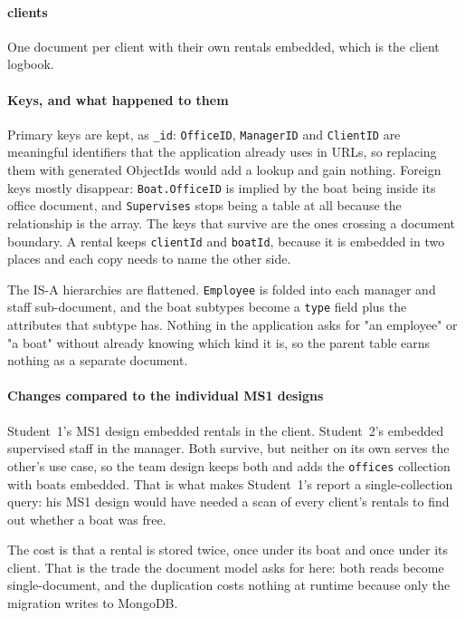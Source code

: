 \documentclass[a4paper, 11pt]{article}          %
\begin{document}
\paragraph{clients} One document per client with their own rentals embedded,
which is the client logbook.

\paragraph{Keys, and what happened to them} Primary keys are kept, as
\texttt{\_id}: \texttt{OfficeID}, \texttt{ManagerID} and \texttt{ClientID} are
meaningful identifiers that the application already uses in URLs, so replacing
them with generated ObjectIds would add a lookup and gain nothing. Foreign keys
mostly disappear: \texttt{Boat.OfficeID} is implied by the boat being inside its
office document, and \texttt{Supervises} stops being a table at all because the
relationship is the array. The keys that survive are the ones crossing a
document boundary. A rental keeps \texttt{clientId} and \texttt{boatId}, because
it is embedded in two places and each copy needs to name the other side.

The IS-A hierarchies are flattened. \texttt{Employee} is folded into each
manager and staff sub-document, and the boat subtypes become a \texttt{type}
field plus the attributes that subtype has. Nothing in the application asks for
"an employee" or "a boat" without already knowing which kind it is, so the
parent table earns nothing as a separate document.

\paragraph{Changes compared to the individual MS1 designs} Student~1's MS1
design embedded rentals in the client. Student~2's embedded supervised staff in
the manager. Both survive, but neither on its own serves the other's use case,
so the team design keeps both and adds the \texttt{offices} collection with
boats embedded. That is what makes Student~1's report a single-collection query:
his MS1 design would have needed a scan of every client's rentals to find out
whether a boat was free.

The cost is that a rental is stored twice, once under its boat and once under
its client. That is the trade the document model asks for here: both reads
become single-document, and the duplication costs nothing at runtime because
only the migration writes to MongoDB.
\end{document}
